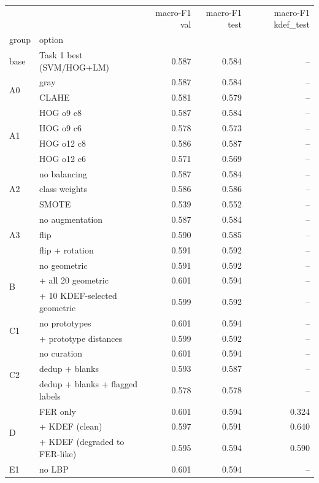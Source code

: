 \begin{tabular}{llrrr}
\toprule
 &  & macro-F1 val & macro-F1 test & macro-F1 kdef_test \\
group & option &  &  &  \\
\midrule
base & Task 1 best (SVM/HOG+LM) & 0.587 & 0.584 & -- \\
\cline{1-5}
\multirow[t]{2}{*}{A0} & gray & 0.587 & 0.584 & -- \\
 & CLAHE & 0.581 & 0.579 & -- \\
\cline{1-5}
\multirow[t]{4}{*}{A1} & HOG o9 c8 & 0.587 & 0.584 & -- \\
 & HOG o9 c6 & 0.578 & 0.573 & -- \\
 & HOG o12 c8 & 0.586 & 0.587 & -- \\
 & HOG o12 c6 & 0.571 & 0.569 & -- \\
\cline{1-5}
\multirow[t]{3}{*}{A2} & no balancing & 0.587 & 0.584 & -- \\
 & class weights & 0.586 & 0.586 & -- \\
 & SMOTE & 0.539 & 0.552 & -- \\
\cline{1-5}
\multirow[t]{3}{*}{A3} & no augmentation & 0.587 & 0.584 & -- \\
 & flip & 0.590 & 0.585 & -- \\
 & flip + rotation & 0.591 & 0.592 & -- \\
\cline{1-5}
\multirow[t]{3}{*}{B} & no geometric & 0.591 & 0.592 & -- \\
 & + all 20 geometric & 0.601 & 0.594 & -- \\
 & + 10 KDEF-selected geometric & 0.599 & 0.592 & -- \\
\cline{1-5}
\multirow[t]{2}{*}{C1} & no prototypes & 0.601 & 0.594 & -- \\
 & + prototype distances & 0.599 & 0.592 & -- \\
\cline{1-5}
\multirow[t]{3}{*}{C2} & no curation & 0.601 & 0.594 & -- \\
 & dedup + blanks & 0.593 & 0.587 & -- \\
 & dedup + blanks + flagged labels & 0.578 & 0.578 & -- \\
\cline{1-5}
\multirow[t]{3}{*}{D} & FER only & 0.601 & 0.594 & 0.324 \\
 & + KDEF (clean) & 0.597 & 0.591 & 0.640 \\
 & + KDEF (degraded to FER-like) & 0.595 & 0.594 & 0.590 \\
\cline{1-5}
\multirow[t]{2}{*}{E1} & no LBP & 0.601 & 0.594 & -- \\

\end{tabular}
